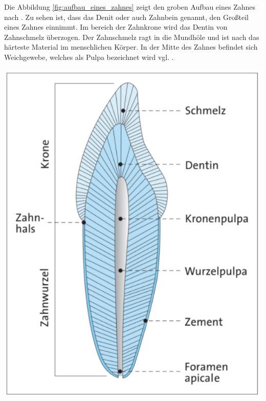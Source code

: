\begin{minipage}{0.40\textwidth}
	Die Abbildung \ref{fig:aufbau_eines_zahnes} zeigt den groben Aufbau eines Zahnes
	nach \citet[Seite 17]{lehmann2012Zahnheilkunde}. Zu sehen ist, dass das Denit oder
	auch Zahnbein genannt, den Großteil eines Zahnes einnimmt. Im bereich der Zahnkrone
	wird das Dentin von Zahnschmelz überzogen. Der Zahnschmelz ragt in die
	Mundhöle und ist nach \cite[Seite 41]{lehmann2012Zahnheilkunde} das härteste
	Material im menschlichen Körper. In der Mitte des Zahnes befindet sich Weichgewebe,
	welches als Pulpa bezeichnet wird vgl. \citep[Seite ]{lehmann2012Zahnheilkunde}.
\end{minipage}
\hfill
\begin{minipage}{0.50\textwidth}
	\centering
	\includegraphics[scale=0.50]{img/aufbau_eines_zahns.jpg}
	 \label{fig:aufbau_eines_zahnes}
\end{minipage}

